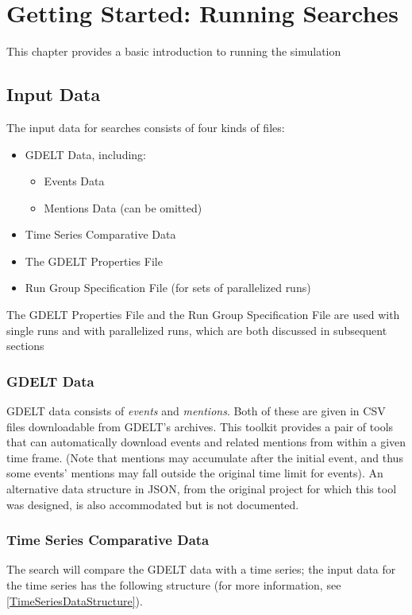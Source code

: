 
\chapter{Getting Started: Running \gdgas Searches} \label{chap:Running}

This chapter provides a basic introduction to running the simulation 	

\section{Input Data}
The input data for \gdgas searches consists of four kinds of files:

\begin{itemize}
\item GDELT Data, including:
\begin{itemize}
\item Events Data
\item Mentions Data (can be omitted)
\end{itemize}
\item Time Series Comparative Data
\item The GDELT Properties File
\item Run Group Specification File (for sets of parallelized runs)
\end{itemize}

The GDELT Properties File and the Run Group Specification File are used with single runs and with parallelized runs, which are both discussed in subsequent sections

\subsection{GDELT Data}
GDELT data consists of \textit{events} and \textit{mentions}. Both of these are given in CSV files downloadable from GDELT's archives. This toolkit provides a pair of tools that can automatically download events and related mentions from within a given time frame. (Note that mentions may accumulate after the initial event, and thus some events' mentions may fall outside the original time limit for events). An alternative data structure in JSON, from the original project for which this tool was designed, is also accommodated but is not documented.

\subsection{Time Series Comparative Data}
The search will compare the GDELT data with a time series; the input data for the time series has the following structure (for more information, see \ref{TimeSeriesDataStructure}).

